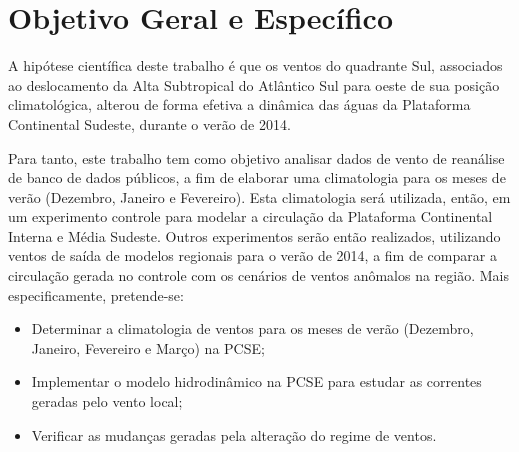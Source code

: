 \section{Objetivo Geral e Específico}
\label{sec:objectives}

\hspace{5mm} A hipótese científica deste trabalho é que os ventos do quadrante Sul, associados
ao deslocamento da Alta Subtropical do Atlântico Sul para oeste de sua posição
climatológica, alterou de forma efetiva a dinâmica das águas da Plataforma
Continental Sudeste, durante o verão de 2014.

\hspace{5mm} Para tanto, este trabalho tem como objetivo analisar dados de vento de reanálise de banco de dados públicos, a fim de elaborar uma climatologia para os meses de verão (Dezembro, Janeiro e Fevereiro). Esta climatologia será utilizada, então, em um experimento controle para modelar a circulação da Plataforma Continental Interna e Média Sudeste. 
Outros experimentos serão então realizados, utilizando ventos de saída de modelos regionais para o verão de 2014, a fim de comparar a circulação gerada no controle com os cenários de ventos anômalos na região. Mais especificamente, pretende-se:

\begin{itemize}
    \item Determinar a climatologia de ventos para os meses de verão (Dezembro, Janeiro, Fevereiro e Março) na PCSE;
    \item Implementar o modelo hidrodinâmico na PCSE para estudar as correntes geradas pelo vento local;
    \item Verificar as mudanças geradas pela alteração do regime de ventos.
\end{itemize}
